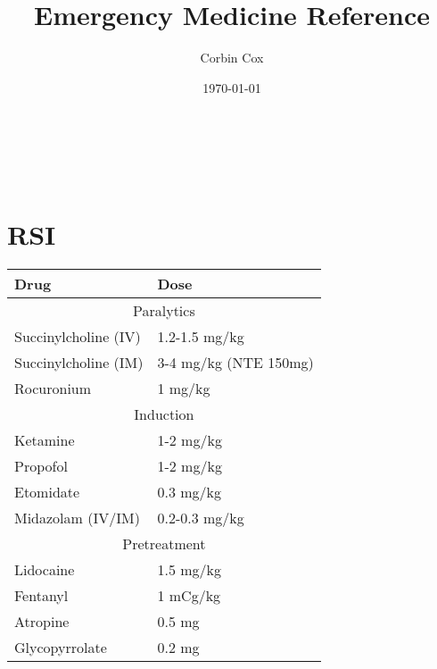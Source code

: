 \documentclass[8pt,twoside]{extarticle}
\title{Emergency Medicine Reference}
\author{Corbin Cox}
\date{\today}
\begin{document}
	
\thispagestyle{empty}
\begin{center}
	\bfseries \huge \thetitle\\
	\vspace*{1em}
	\large \theauthor\\
	\vspace*{1em}
	\normalsize \thedate
\end{center}

\tableofcontents

\newpage

\section{RSI}
\begin{table}[h!]
\centering
\begin{tabular}{l l}
	\textbf{Drug} & \textbf{Dose} \\ \hline
	\multicolumn{2}{c}{Paralytics}\\
	Succinylcholine (IV) & 1.2-1.5 mg/kg \\
	Succinylcholine (IM) & 3-4 mg/kg (NTE 150mg) \\
	Rocuronium & 1 mg/kg \\ \hline
	\multicolumn{2}{c}{Induction}\\
	Ketamine & 1-2 mg/kg \\ 
	Propofol & 1-2 mg/kg \\
	Etomidate & 0.3 mg/kg \\
	Midazolam (IV/IM) & 0.2-0.3 mg/kg \\ \hline
	\multicolumn{2}{c}{Pretreatment}\\
	Lidocaine & 1.5 mg/kg \\
	Fentanyl & 1 mCg/kg\\
	Atropine & 0.5 mg\\
	Glycopyrrolate &  0.2 mg
\end{tabular}
\end{table}

\newpage
\end{document}
